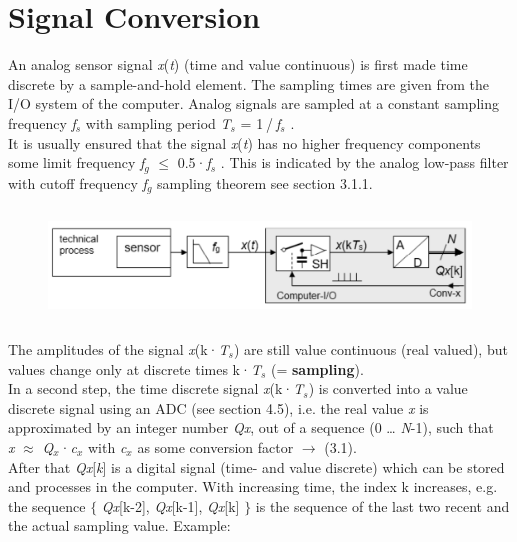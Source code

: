 \section{Signal Conversion}

An analog sensor signal \textit{x}(\textit{t}) (time and value continuous) is first made time discrete by a sample-and-hold element. The sampling times are given from the I/O system of the computer. Analog signals are sampled at a constant sampling frequency \textit{f${}_{s}$} with sampling period \textit{T${}_{s}$} = 1${}_{\ }$/${}_{\ }$\textit{f${}_{s}$} .\\

It is usually ensured that the signal \textit{x}(\textit{t}) has no higher frequency components some limit frequency \textit{f${}_{g}$} $\mathrm{\le}$ 0.5·\textit{f${}_{s}$} . This is indicated by the analog low-pass filter with cutoff frequency \textit{f${}_{g}$}  sampling theorem see section 3.1.1.

    \begin{figure}[h]
    \centering
    \includegraphics[width=15cm, height=3cm]{Images/image137.png}
    \label{fig:Fig 88}
    \end{figure}

The amplitudes of the signal \textit{x}(k·\textit{T${}_{s}$}) are still value continuous (real valued), but values change only at discrete times k·\textit{T${}_{s}$} (= \textbf{sampling}).\\

In a second step, the time discrete signal \textit{x}(k·\textit{T${}_{s}$}) is converted into a value discrete signal using an ADC (see section 4.5), i.e. the real value \textit{x} is approximated by an integer number \textit{Qx}, out of a sequence (0 {\dots} \textit{N}-1), such that \\

\textit{x} $\mathrm{\approx}$ \textit{Q${}_{x}$}·\textit{c${}_{x}$}       with \textit{c${}_{x}$} as some conversion factor  $\rightarrow$ (3.1).\\

After that \textit{Qx}[\textit{k}] is a digital signal (time- and value discrete) which can be stored and processes in the computer. With increasing time, the index k increases, e.g. the sequence $\mathrm{\{}$ \textit{Qx}[k-2], \textit{Qx}[k-1], \textit{Qx}[k] $\mathrm{\}}$ is the sequence of the last two recent and the actual sampling value. Example:\\

